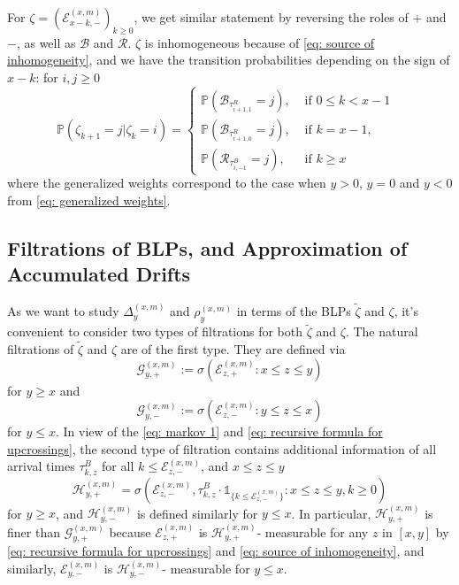 \documentclass[twoside,12pt,a4paper]{article}
\numberwithin{equation}{section}
\begin{document}
	   For $\zeta= \left(\mathcal{E}^{(x,m)}_{x-k,-} \right)_{k\geq 0}$, we get similar statement by reversing the roles of $+$ and $-$, as well as $\mathcal{B}$ and $\mathcal{R}$. $\zeta$ is inhomogeneous because of \eqref{eq: source of inhomogeneity}, and we have the transition probabilities depending on the sign of $x-k$: for $i,j\geq 0$
	   \begin{equation}\label{eq: transition prob on negative}
		   	\mathbb{P}\left(\zeta_{k+1}=j \vert \zeta_k =i  \right) = 
		   \begin{cases}
		   	\mathbb{P}\left( \mathcal{B}_{\tau_{i+1,1}^R} = j \right) ,& \mbox{ if $0 \leq k <  x-1$ }
		   	\\
		   	\mathbb{P}\left( \mathcal{B}_{\tau_{i+1,0}^R} = j \right) ,& \mbox{ if  $k =  x-1$, }
		   	\\
		   	\mathbb{P}\left( \mathcal{R}_{\tau_{i,-1}^B} = j \right) ,& \mbox{ if $k \geq x$ }
		   \end{cases}
		\end{equation}
 where the generalized weights correspond to the case when $y>0$, $y=0$ and $y<0$ from \eqref{eq: generalized weights}.

\subsection{Filtrations of BLPs, and Approximation of Accumulated Drifts}\label{subsec: measurability}

As we want to study $\Delta^{(x,m)}_{y}$ and $\rho^{(x,m)}_{y}$ in terms of the BLPs $\tilde{\zeta}$ and $\zeta$, it's convenient to consider two types of filtrations for both $\tilde{\zeta}$ and $\zeta$. The natural filtrations of $\tilde{\zeta}$ and $\zeta$ are of the first type. They are defined via 
$$\mathcal{G}_{y, +}^{(x,m)}:=\sigma\left(\mathcal{E}^{(x,m)}_{z, +}: x \le z \le y\right) $$ for $y \ge x$ and $$\mathcal{G}_{y, -}^{(x,m)}:=\sigma\left(\mathcal{E}^{(x,m)}_{z, -}: y \le z \le x\right) $$ for $y \le x$.
In view of the \eqref{eq: markov 1} and \eqref{eq: recursive formula for upcrossings},
the second type of filtration contains additional information of all arrival times $\tau^B_{k,z}$ for all $k\leq \mathcal{E}^{(x,m)}_{z, -}$, and $x\leq z \leq y$
\[
	\mathcal{H}_{y, +}^{(x,m)} = \sigma\left( \mathcal{E}_{z, -}^{(x,m)}, \tau_{k, z}^{B}\cdot \mathbb{1}_{\{ k\leq \mathcal{E}_{z, -}^{(x,m)} \}} : x \leq  z \leq y,  k \geq 0 \right) 
\]
for $y\geq x$, and $\mathcal{H}_{y, -}^{(x,m)}$ is defined similarly for $y\leq x$.
In particular, $\mathcal{H}_{y, +}^{(x,m)}$ is finer than $\mathcal{G}_{y, +}^{(x,m)}$ because $\mathcal{E}_{z, +}^{(x,m)}$ is  $\mathcal{H}_{y, +}^{(x,m)}$- measurable for any $z$ in $[x,y]$ by \eqref{eq: recursive formula for upcrossings} and \eqref{eq: source of inhomogeneity}, and similarly, $\mathcal{E}_{y, -}^{(x,m)}$ is $\mathcal{H}_{y, -}^{(x,m)}$- measurable for $ y\leq x$. 
\end{document}
